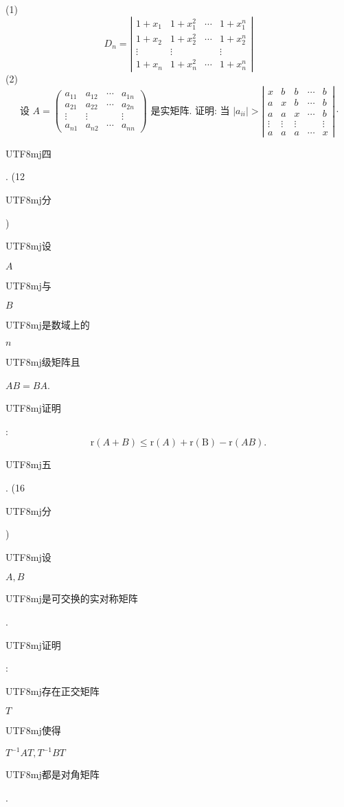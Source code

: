 \documentclass[10pt]{article}
\begin{document}
(1)
$$
D_{n}=\left|\begin{array}{cccc}
1+x_{1} & 1+x_{1}^{2} & \cdots & 1+x_{1}^{n} \\
1+x_{2} & 1+x_{2}^{2} & \cdots & 1+x_{2}^{n} \\
\vdots & \vdots & & \vdots \\
1+x_{n} & 1+x_{n}^{2} & \cdots & 1+x_{n}^{n}
\end{array}\right|
$$
(2)
$$
\text { 设 } A=\left(\begin{array}{cccc}
a_{11} & a_{12} & \cdots & a_{1 n} \\
a_{21} & a_{22} & \cdots & a_{2 n} \\
\vdots & \vdots & & \vdots \\
a_{n 1} & a_{n 2} & \cdots & a_{n n}
\end{array}\right) \text { 是实矩阵. 证明: 当 }\left|a_{i i}\right|>\left|\begin{array}{ccccc}
x & b & b & \cdots & b \\
a & x & b & \cdots & b \\
a & a & x & \cdots & b \\
\vdots & \vdots & \vdots & & \vdots \\
a & a & a & \cdots & x
\end{array}\right| \cdot
$$
\begin{CJK}{UTF8}{mj}四\end{CJK}. (12 \begin{CJK}{UTF8}{mj}分\end{CJK}) \begin{CJK}{UTF8}{mj}设\end{CJK} $A$ \begin{CJK}{UTF8}{mj}与\end{CJK} $B$ \begin{CJK}{UTF8}{mj}是数域上的\end{CJK} $n$ \begin{CJK}{UTF8}{mj}级矩阵且\end{CJK} $A B=B A$. \begin{CJK}{UTF8}{mj}证明\end{CJK}:
$$
\mathrm{r}(A+B) \leqslant \mathrm{r}(A)+\mathrm{r}(\mathrm{B})-\mathrm{r}(A B) .
$$
\begin{CJK}{UTF8}{mj}五\end{CJK}. (16 \begin{CJK}{UTF8}{mj}分\end{CJK}) \begin{CJK}{UTF8}{mj}设\end{CJK} $A, B$ \begin{CJK}{UTF8}{mj}是可交换的实对称矩阵\end{CJK}. \begin{CJK}{UTF8}{mj}证明\end{CJK}: \begin{CJK}{UTF8}{mj}存在正交矩阵\end{CJK} $T$ \begin{CJK}{UTF8}{mj}使得\end{CJK} $T^{-1} A T, T^{-1} B T$ \begin{CJK}{UTF8}{mj}都是对角矩阵\end{CJK}.
\end{document}

